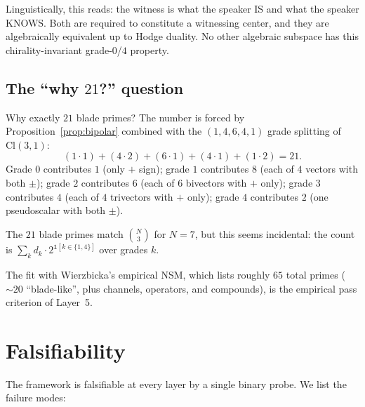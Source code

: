 \documentclass[11pt,a4paper]{article}
\theoremstyle{plain}
\theoremstyle{definition}
\theoremstyle{remark}
\numberwithin{equation}{section}
\providecommand{\Cl}{\mathrm{Cl}}
\begin{document}
Linguistically, this reads: the witness is what the speaker IS and
what the speaker KNOWS.  Both are required to constitute a
witnessing center, and they are algebraically equivalent up to
Hodge duality.  No other algebraic subspace has this
chirality-invariant grade-$0$/$4$ property.

\subsection{The ``why $21$?'' question}

Why exactly $21$ blade primes?  The number is forced by
Proposition~\ref{prop:bipolar} combined with the
$(1, 4, 6, 4, 1)$ grade splitting of $\Cl(3,1)$:
\[
  (1 \cdot 1) + (4 \cdot 2) + (6 \cdot 1) + (4 \cdot 1) +
  (1 \cdot 2) = 21.
\]
Grade $0$ contributes $1$ (only $+$ sign);
grade $1$ contributes $8$ (each of $4$ vectors with both $\pm$);
grade $2$ contributes $6$ (each of $6$ bivectors with $+$ only);
grade $3$ contributes $4$ (each of $4$ trivectors with $+$ only);
grade $4$ contributes $2$ (one pseudoscalar with both $\pm$).

The $21$ blade primes match $\binom{N}{3}$ for $N = 7$, but this
seems incidental: the count is $\sum_k d_k \cdot 2^{\mathbb{1}[k \in
\{1, 4\}]}$ over grades $k$.

The fit with Wierzbicka's empirical NSM, which lists roughly $65$
total primes ($\sim 20$ ``blade-like'', plus channels, operators,
and compounds), is the empirical pass criterion of Layer~5.


\section{Falsifiability}\label{sec:falsifiability}

The framework is falsifiable at every layer by a single binary
probe.  We list the failure modes:
\end{document}
